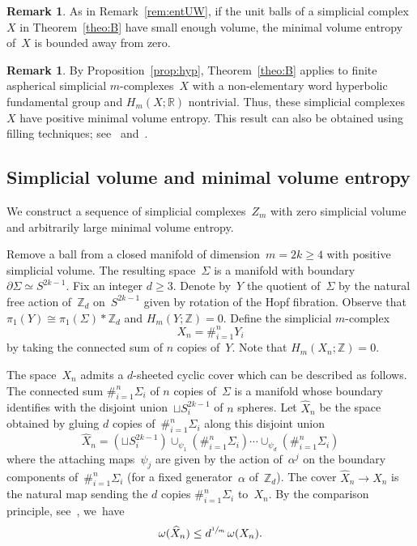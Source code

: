 \documentclass[11pt]{article}
\let\oldsfrac\sfrac
\renewcommand{\sfrac}[2]{{\oldsfrac{#1}{#2}}}
\theoremstyle{definition}
\newtheorem{remark}[theorem]{Remark}
\newcommand\R{{\mathbb R}}
\newcommand\Z{{\mathbb Z}}
\numberwithin{equation}{section}
\begin{document}
\begin{remark} \label{rem:entUW2}
As in Remark~\ref{rem:entUW}, if the unit balls of a simplicial complex~$X$ in Theorem~\ref{theo:B} have small enough volume, the minimal volume entropy of~$X$ is bounded away from zero.
\end{remark}

\begin{remark}
By Proposition~\ref{prop:hyp}, Theorem~\ref{theo:B} applies to finite aspherical simplicial $m$\nobreakdash-complexes~$X$ with a non-elementary word hyperbolic fundamental group and $H_m(X;\R)$ nontrivial.
Thus, these simplicial complexes~$X$ have positive minimal volume entropy.
This result can also be obtained using filling techniques; see~\cite{minentB} and~\cite{sab17}.
\end{remark}

\subsection{Simplicial volume and minimal volume entropy} \label{subsec:ex}
We construct a sequence of simplicial complexes~$Z_m$ with zero simplicial volume and arbitrarily large minimal volume entropy.

Remove a ball from a closed manifold of dimension~$m=2k \geq 4$ with positive simplicial volume.
The resulting space~$\Sigma$ is a manifold with boundary $\partial \Sigma \simeq S^{2k-1}$.
Fix an integer $d \geq 3$.
Denote by~$Y$ the quotient of~$\Sigma$ by the natural free action of~$\Z_d$ on~$S^{2k-1}$ given by rotation of the Hopf fibration.
Observe that $\pi_1(Y) \cong \pi_1(\Sigma) \ast \Z_d$ and $H_m(Y;\Z)=0$.
Define the simplicial $m$\nobreakdash-complex
\[
X_n = \#_{i=1}^n Y_i
\]
by taking the connected sum of $n$ copies of~$Y$.
Note that $H_m(X_n;\Z)=0$.

The space~$X_n$ admits a $d$-sheeted cyclic cover which can be described as follows.
The connected sum $\#_{i=1}^n \Sigma_i$ of $n$ copies of~$\Sigma$ is a manifold whose boundary identifies with the disjoint union~$\sqcup S_i^{2k-1}$ of $n$ spheres.
Let $\widehat{X}_n$ be the space obtained by gluing $d$ copies of~$\#_{i=1}^n \Sigma_i$ along this disjoint union
\[
\widehat{X}_n = (\sqcup S_i^{2k-1}) \cup_{\psi_1} (\#_{i=1}^n \Sigma_i) \cdots \cup_{\psi_d} (\#_{i=1}^n \Sigma_i)
\]
where the attaching maps~$\psi_j$ are given by the action of~$\alpha^j$ on the boundary components of~$\#_{i=1}^n \Sigma_i$ (for a fixed generator~$\alpha$ of~$\Z_d$).
The cover $\widehat{X}_n \to X_n$ is the natural map sending the $d$ copies $\#_{i=1}^n \Sigma_i$ to~$X_n$.
By the comparison principle, see~\cite[Lem.\,4.1]{Brunnbauer08}, we~have
\begin{equation} \label{eq:d}
\omega(\widehat{X}_n) \leq d^\sfrac{1}{m} \, \omega(X_n).
\end{equation}
\end{document}
